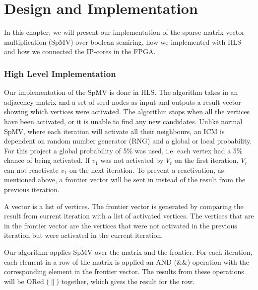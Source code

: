 \chapter{Design and Implementation} \label{methode}
In this chapter, we will present our implementation of the sparse matrix-vector multiplication (SpMV) over boolean semiring, how we implemented with HLS and how we connected the IP-cores in the FPGA.



\subsection{High Level Implementation}
Our implementation of the SpMV is done in HLS. The algorithm takes in an adjacency matrix and a set of seed nodes as input and outputs a result vector showing which vertices were activated. The algorithm stops when all the vertices have been activated, or it is unable to find any new candidates. Unlike normal SpMV, where each iteration will activate all their neighbours, an ICM is dependent on random number generator (RNG) and a global or local probability. For this project a global probability of 5\% was used, i.e. each vertex had a 5\% chance of being activated. If $v_1$ was not activated by $V_r$ on the first iteration, $V_r$ can not reactivate $v_1$ on the next iteration. To prevent a reactivation, as mentioned above, a frontier vector will be sent in instead of the result from the previous iteration. 

A vector is a list of vertices. The frontier vector is generated by comparing the result from current iteration with a list of activated vertices. The vertices that are in the frontier vector are the vertices that were not activated in the previous iteration but were activated in the current iteration. 

Our algorithm applies SpMV over the matrix and the frontier. For each iteration, each element in a row of the matrix is applied an AND (\&\&) operation with the corresponding element in the frontier vector. The results from these operations will be ORed ($\|$) together, which gives the result for the row.\begin{algorithm}
\begin{algorithmic}
\end{algorithmic}
\end{algorithm}



